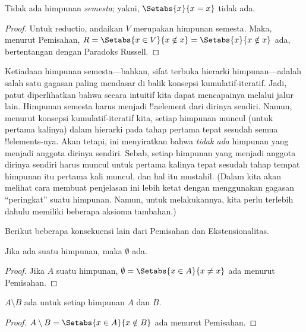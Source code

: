 \documentclass[../../../include/open-logic-section]{subfiles}
\begin{document}
\begin{thm}
Tidak ada himpunan \emph{semesta}; yakni, $\Setabs{x}{x = x}$ tidak ada.
\end{thm}

\begin{proof}
Untuk reductio, andaikan $V$ merupakan himpunan semesta. Maka, menurut
Pemisahan, $R = \Setabs{x \in V}{x \notin x} =
\Setabs{x}{x \notin x}$ ada, bertentangan dengan Paradoks Russell.
\end{proof}

Ketiadaan himpunan semesta---bahkan, sifat terbuka hierarki himpunan---adalah
salah satu gagasan paling mendasar di balik konsepsi kumulatif-iteratif. Jadi,
patut diperlihatkan bahwa secara intuitif kita dapat mencapainya melalui
jalur lain. Himpunan semesta harus menjadi !!a{element} dari dirinya sendiri.
Namun, menurut konsepsi kumulatif-iteratif kita, setiap himpunan muncul (untuk
pertama kalinya) dalam hierarki pada tahap pertama tepat sesudah semua
!!{element}s-nya. Akan tetapi, ini menyiratkan bahwa \emph{tidak ada}
himpunan yang menjadi anggota dirinya sendiri. Sebab, setiap himpunan yang
menjadi anggota dirinya sendiri harus muncul untuk pertama kalinya tepat
sesudah tahap tempat himpunan itu pertama kali muncul, dan hal itu mustahil.
(Dalam  kita akan melihat cara membuat
penjelasan ini lebih ketat dengan menggunakan gagasan ``peringkat'' suatu
himpunan. Namun, untuk melakukannya, kita perlu terlebih dahulu memiliki
beberapa aksioma tambahan.)

Berikut beberapa konsekuensi lain dari Pemisahan dan Ekstensionalitas.

\begin{prop}
Jika ada suatu himpunan, maka $\emptyset$ ada.
\end{prop}

\begin{proof}
Jika $A$ suatu himpunan, $\emptyset = \Setabs{x \in A}{x \neq x}$ ada
menurut Pemisahan.
\end{proof}

\begin{prop}
$A \setminus B$ ada untuk setiap himpunan $A$ dan $B$.
\end{prop}

\begin{proof}
$A \setminus B = \Setabs{x \in A}{x \notin B}$ ada menurut Pemisahan.
\end{proof}
\end{document}
